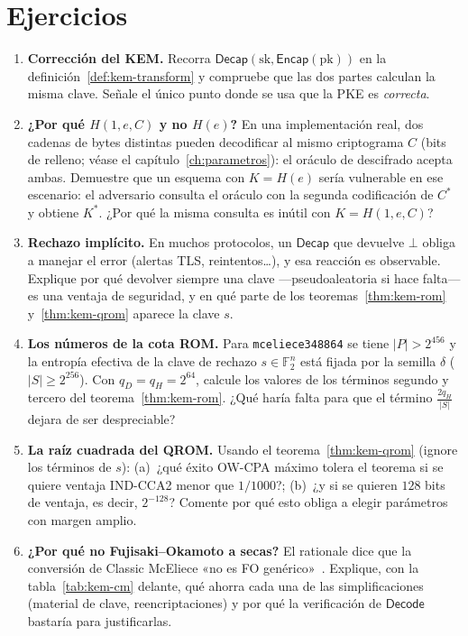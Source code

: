 \documentclass[11pt,a4paper,oneside]{report}
\newcommand{\F}{\mathbb{F}}
\newcommand{\Ftwo}{\F_2}
\begin{document}
\section{Ejercicios}

\begin{enumerate}[leftmargin=1.6em,itemsep=4pt]
  \item \textbf{Corrección del KEM.} Recorra
        $\textsf{Decap}(\mathrm{sk},\textsf{Encap}(\mathrm{pk}))$ en la
        definición~\ref{def:kem-transform} y compruebe que las dos
        partes calculan la misma clave. Señale el único punto donde se
        usa que la PKE es \emph{correcta}.
  \item \textbf{¿Por qué $H(1,e,C)$ y no $H(e)$?} En una
        implementación real, dos cadenas de bytes distintas pueden
        decodificar al mismo criptograma $C$ (bits de relleno; véase el
        capítulo~\ref{ch:parametros}): el oráculo de descifrado acepta
        ambas. Demuestre que un esquema con $K=H(e)$ sería vulnerable
        en ese escenario: el adversario consulta el oráculo con la
        segunda codificación de $C^*$ y obtiene $K^*$. ¿Por qué la
        misma consulta es inútil con $K=H(1,e,C)$?
  \item \textbf{Rechazo implícito.} En muchos protocolos, un
        $\textsf{Decap}$ que devuelve $\bot$ obliga a manejar el error
        (alertas TLS, reintentos\ldots), y esa reacción es observable.
        Explique por qué devolver siempre una clave ---pseudoaleatoria
        si hace falta--- es una ventaja de seguridad, y en qué parte
        de los teoremas~\ref{thm:kem-rom} y~\ref{thm:kem-qrom} aparece
        la clave $s$.
  \item \textbf{Los números de la cota ROM.} Para
        \texttt{mceliece348864} se tiene $|P|>2^{456}$ y la entropía efectiva
        de la clave de rechazo $s\in\Ftwo^n$ está fijada por la semilla
        $\delta$ ($|S|\ge 2^{256}$). Con $q_D=q_H=2^{64}$, calcule los valores
        de los términos segundo y tercero del teorema~\ref{thm:kem-rom}. ¿Qué haría
        falta para que el término $\frac{2q_H}{|S|}$ dejara de ser
        despreciable?
  \item \textbf{La raíz cuadrada del QROM.} Usando el
        teorema~\ref{thm:kem-qrom} (ignore los términos de $s$):
        (a)~¿qué éxito OW-CPA máximo tolera el teorema si se quiere
        ventaja IND-CCA2 menor que $1/1000$?; (b)~¿y si se quieren
        $128$ bits de ventaja, es decir, $2^{-128}$? Comente por qué
        esto obliga a elegir parámetros con margen amplio.
  \item \textbf{¿Por qué no Fujisaki--Okamoto a secas?} El rationale
        dice que la conversión de Classic McEliece «no es FO
        genérico»~\cite{cmrationale}. Explique, con la
        tabla~\ref{tab:kem-cm} delante, qué ahorra cada una de las
        simplificaciones (material de clave, reencriptaciones) y por
        qué la verificación de $\textsf{Decode}$ bastaría para
        justificarlas.
\end{enumerate}
\end{document}
